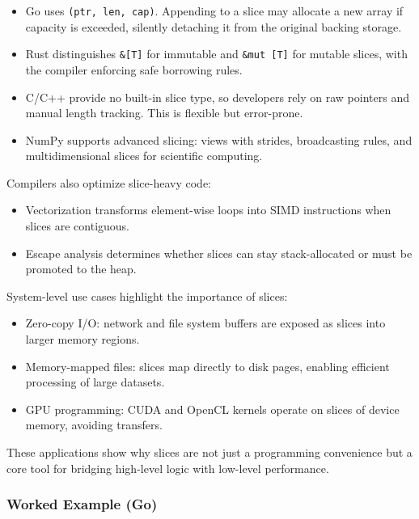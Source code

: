 \documentclass[
  letterpaper,
  DIV=11,
  numbers=noendperiod]{scrreprt}
\providecommand{\tightlist}{%
  \setlength{\itemsep}{0pt}\setlength{\parskip}{0pt}}
\begin{document}
\begin{itemize}
\tightlist
\item
  Go uses \texttt{(ptr,\ len,\ cap)}. Appending to a slice may allocate
  a new array if capacity is exceeded, silently detaching it from the
  original backing storage.
\item
  Rust distinguishes \texttt{\&{[}T{]}} for immutable and
  \texttt{\&mut\ {[}T{]}} for mutable slices, with the compiler
  enforcing safe borrowing rules.
\item
  C/C++ provide no built-in slice type, so developers rely on raw
  pointers and manual length tracking. This is flexible but error-prone.
\item
  NumPy supports advanced slicing: views with strides, broadcasting
  rules, and multidimensional slices for scientific computing.
\end{itemize}

Compilers also optimize slice-heavy code:

\begin{itemize}
\tightlist
\item
  Vectorization transforms element-wise loops into SIMD instructions
  when slices are contiguous.
\item
  Escape analysis determines whether slices can stay stack-allocated or
  must be promoted to the heap.
\end{itemize}

System-level use cases highlight the importance of slices:

\begin{itemize}
\tightlist
\item
  Zero-copy I/O: network and file system buffers are exposed as slices
  into larger memory regions.
\item
  Memory-mapped files: slices map directly to disk pages, enabling
  efficient processing of large datasets.
\item
  GPU programming: CUDA and OpenCL kernels operate on slices of device
  memory, avoiding transfers.
\end{itemize}

These applications show why slices are not just a programming
convenience but a core tool for bridging high-level logic with low-level
performance.

\subsubsection{Worked Example (Go)}\label{worked-example-go}
\end{document}
